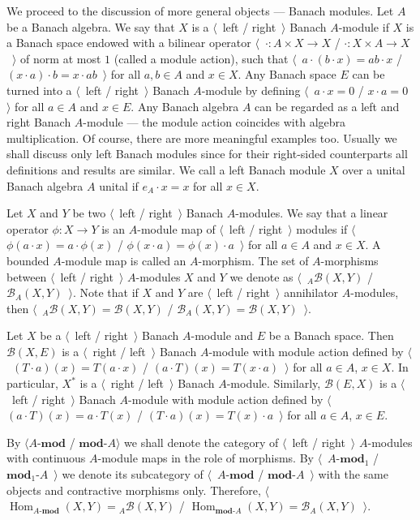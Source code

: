 We proceed to the discussion of more general objects --- Banach modules. Let $A$
be a Banach algebra. We say that $X$ is a $\langle$~left / right~$\rangle$
Banach $A$-module if $X$ is a Banach space endowed with a bilinear operator
$\langle$~$\cdot:A\times X\to X$ / $\cdot: X\times A\to X$~$\rangle$ of norm at
most $1$ (called a module action), such that 
$\langle$~$a\cdot(b\cdot x)=ab\cdot x$ / 
$(x\cdot a)\cdot b=x\cdot ab$~$\rangle$ for all $a,b\in A$ and $x\in X$.
Any Banach space $E$ can be turned into a $\langle$~left / right~$\rangle$
Banach $A$-module by defining $\langle$~$a\cdot x=0$ / $x\cdot a=0$~$\rangle$
for all $a\in A$ and $x\in E$. Any Banach algebra $A$ can be regarded as a left
and right Banach $A$-module --- the module action coincides with algebra
multiplication. Of course, there are more meaningful examples too.  Usually we
shall discuss only left Banach modules since for their right-sided counterparts
all definitions and results are similar. We call a left Banach module $X$ over a 
unital Banach algebra $A$ unital if $e_A\cdot x=x$ for all $x\in X$. 

Let $X$ and $Y$ be two $\langle$~left / right~$\rangle$ Banach $A$-modules. We say
that a linear operator $\phi:X\to Y$ is an $A$-module map of $\langle$~left /
right~$\rangle$ modules if $\langle$~$\phi(a\cdot x)=a\cdot \phi(x)$ /
$\phi(x\cdot a)=\phi(x)\cdot a$~$\rangle$ for all $a\in A$ and $x\in X$. A
bounded $A$-module map is called an $A$-morphism. The set of $A$-morphisms
between $\langle$~left / right~$\rangle$ $A$-modules $X$ and $Y$ we denote as
$\langle$~${}_A\mathcal{B}(X,Y)$ / $\mathcal{B}_A(X,Y)$~$\rangle$. Note that if
$X$ and $Y$ are $\langle$~left / right~$\rangle$ annihilator $A$-modules, then
$\langle$~${}_A\mathcal{B}(X,Y)=\mathcal{B}(X,Y)$ /
$\mathcal{B}_A(X,Y)=\mathcal{B}(X,Y)$~$\rangle$.

Let $X$ be a $\langle$~left / right~$\rangle$ Banach $A$-module and $E$ be a
Banach space. Then $\mathcal{B}(X,E)$ is a $\langle$~right / left~$\rangle$ 
Banach $A$-module with module action defined 
by $\langle$~$(T\cdot a)(x)=T(a\cdot x)$ / $(a\cdot T)(x)=T(x\cdot a)$~$\rangle$ 
for all $a\in A$, $x\in X$. In particular, $X^*$ is 
a $\langle$~right / left~$\rangle$ Banach $A$-module. Similarly, 
$\mathcal{B}(E, X)$ is a $\langle$~left / right~$\rangle$ Banach $A$-module 
with module action defined 
by $\langle$~$(a\cdot T)(x)=a\cdot T(x)$ / $(T\cdot a)(x)=T(x)\cdot a$~$\rangle$ 
for all $a\in A$, $x\in E$.

By $\langle A\text{-}\mathbf{mod}$ / $\mathbf{mod}\text{-}A\rangle$ we shall denote the
category of $\langle$~left / right~$\rangle$ $A$-modules with continuous
$A$-module maps in the role of morphisms. By $\langle$~$A\text{-}\mathbf{mod}_1$ /
$\mathbf{mod}_1\text{-}A$~$\rangle$ we denote its subcategory of
$\langle$~$A\text{-}\mathbf{mod}$ / $\mathbf{mod}\text{-}A$~$\rangle$ with the same objects
and contractive morphisms only. Therefore,
$\langle$~$\operatorname{Hom}_{A\text{-}\mathbf{mod}}(X,Y)={}_A\mathcal{B}(X,Y)$ /
$\operatorname{Hom}_{\mathbf{mod}\text{-}A}(X,Y)=\mathcal{B}_A(X,Y)$~$\rangle$. 


